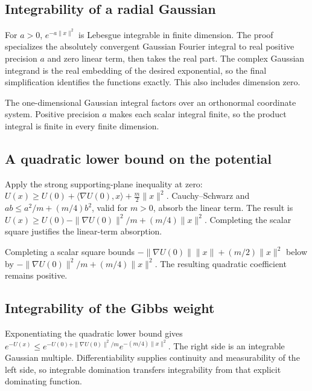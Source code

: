 \documentclass[11pt,a4paper]{report}
\begin{document}
\subsection{\texorpdfstring{Integrability of a radial Gaussian}{Integrability of a radial Gaussian}}
\label{report-step-UnadjustedLangevin-Gibbs-lean-4}


For \(a>0\), \(e^{-a\|x\|^2}\) is Lebesgue integrable in finite dimension. The proof specializes the absolutely convergent Gaussian Fourier integral to real positive precision \(a\) and zero linear term, then takes the real part. The complex Gaussian integrand is the real embedding of the desired exponential, so the final simplification identifies the functions exactly. This also includes dimension zero.



The one-dimensional Gaussian integral factors over an orthonormal coordinate system. Positive precision \(a\) makes each scalar integral finite, so the product integral is finite in every finite dimension.

\subsection{\texorpdfstring{A quadratic lower bound on the potential}{A quadratic lower bound on the potential}}
\label{report-step-UnadjustedLangevin-Gibbs-lean-5}


Apply the strong supporting-plane inequality at zero: \(U(x)\ge U(0)+\langle\nabla U(0),x\rangle+\frac m2\|x\|^2\). Cauchy–Schwarz and \(ab\le a^2/m+(m/4)b^2\), valid for \(m>0\), absorb the linear term. The result is \(U(x)\ge U(0)-\|\nabla U(0)\|^2/m+(m/4)\|x\|^2\). Completing the scalar square justifies the linear-term absorption.



Completing a scalar square bounds \(-\|\nabla U(0)\|\|x\|+(m/2)\|x\|^2\) below by \(-\|\nabla U(0)\|^2/m+(m/4)\|x\|^2\). The resulting quadratic coefficient remains positive.

\subsection{\texorpdfstring{Integrability of the Gibbs weight}{Integrability of the Gibbs weight}}
\label{report-step-UnadjustedLangevin-Gibbs-lean-6}


Exponentiating the quadratic lower bound gives \(e^{-U(x)}\le e^{-U(0)+\|\nabla U(0)\|^2/m}e^{-(m/4)\|x\|^2}\). The right side is an integrable Gaussian multiple. Differentiability supplies continuity and measurability of the left side, so integrable domination transfers integrability from that explicit dominating function.
\end{document}
